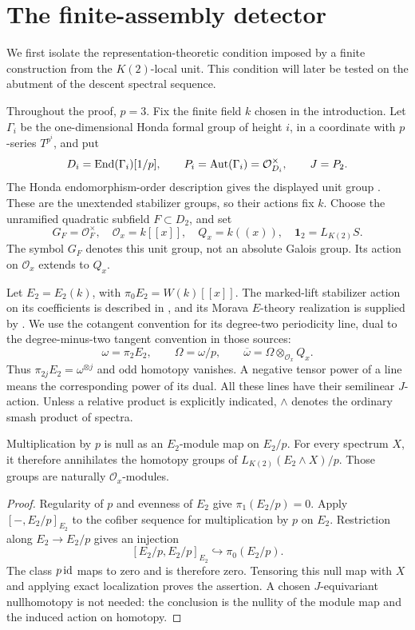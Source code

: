 \section{The finite-assembly detector}\label{sec:detector}

We first isolate the representation-theoretic condition imposed by a finite
construction from the \(K(2)\)-local unit. This condition will later be
tested on the abutment of the descent spectral sequence.

Throughout the proof, \(p=3\). Fix the finite field \(k\) chosen in the
introduction. Let \(\Gamma_i\) be the one-dimensional Honda formal group of
height \(i\), in a coordinate with \(p\)-series \(T^{p^i}\), and put
\[
 D_i=\operatorname{End}(\Gamma_i)[1/p],\qquad
 P_i=\operatorname{Aut}(\Gamma_i)=\mathcal O_{D_i}^{\times},\qquad J=P_2.
\]
The Honda endomorphism-order description gives the displayed unit group
\citep[Example~2.15]{BGHS22}.
These are the unextended stabilizer groups, so their actions fix \(k\).
Choose the unramified quadratic subfield \(F\subset D_2\), and set
\[
 G_F=\mathcal O_F^\times,\quad
 \mathcal O_x=k[[x]],\quad Q_x=k((x)),\quad
 \mathbf 1_2=L_{K(2)}S.
\]
The symbol \(G_F\) denotes this unit group, not an absolute Galois group.
Its action on \(\mathcal O_x\) extends to \(Q_x\).

Let \(E_2=E_2(k)\), with \(\pi_0E_2=W(k)[[x]]\). The marked-lift
stabilizer action on its coefficients is described in
\citet[Theorem~1.1 and Equation~(1.4)]{DH95}, and its Morava \(E\)-theory
realization is supplied by \citet[Corollaries~7.6--7.7]{GH04}.
We use the cotangent convention for its degree-two periodicity line,
dual to the degree-minus-two tangent convention in those sources:
\[
 \omega=\pi_2E_2,\qquad
 \Omega=\omega/p,\qquad
 \overline\omega=\Omega\otimes_{\mathcal O_x}Q_x.
\]
Thus \(\pi_{2j}E_2=\omega^{\otimes j}\) and odd homotopy vanishes. A
negative tensor power of a line means the corresponding power of its dual.
All these lines have their semilinear \(J\)-action. Unless a relative
product is explicitly indicated, \(\wedge\) denotes the ordinary smash
product of spectra.

\begin{lemma}\label{lem:mod-p-nullity}
Multiplication by \(p\) is null as an \(E_2\)-module map on \(E_2/p\).
For every spectrum \(X\), it therefore annihilates the homotopy groups of
\(L_{K(2)}(E_2\wedge X)/p\). Those groups are naturally
\(\mathcal O_x\)-modules.
\end{lemma}

\begin{proof}
Regularity of \(p\) and evenness of \(E_2\) give \(\pi_1(E_2/p)=0\).
Apply \([-,E_2/p]_{E_2}\) to the cofiber sequence for multiplication by
\(p\) on \(E_2\). Restriction along \(E_2\to E_2/p\) gives an injection
\[
 [E_2/p,E_2/p]_{E_2}\hookrightarrow\pi_0(E_2/p).
\]
The class \(p\operatorname{id}\) maps to zero and is therefore zero. Tensoring this null
map with \(X\) and applying exact localization proves the assertion. A
chosen \(J\)-equivariant nullhomotopy is not needed: the conclusion is the
nullity of the module map and the induced action on homotopy.
\end{proof}

